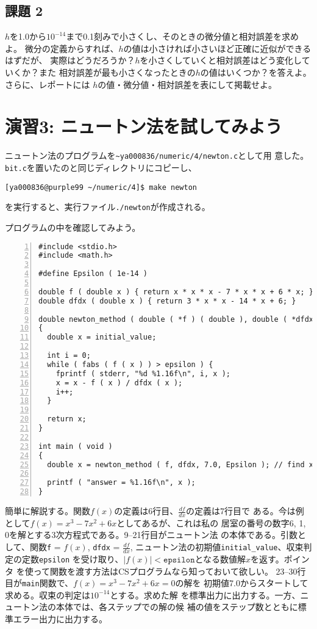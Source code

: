 \documentclass[a4paper]{jsarticle}
\begin{document}
\subsection*{課題 2}
$h$を1.0から$10^{-14}$まで0.1刻みで小さくし、そのときの微分値と相対誤差を求めよ。
微分の定義からすれば、$h$の値は小さければ小さいほど正確に近似ができるはずだが、
実際はどうだろうか？$h$を小さくしていくと相対誤差はどう変化していくか？また
相対誤差が最も小さくなったときの$h$の値はいくつか？を答えよ。さらに、レポートには
$h$の値・微分値・相対誤差を表にして掲載せよ。

\section*{演習3: ニュートン法を試してみよう}

ニュートン法のプログラムを\texttt{\~{}ya000836/numeric/4/newton.c}として用
意した。\texttt{bit.c}を置いたのと同じディレクトリにコピーし、
\begin{lstlisting}
[ya000836@purple99 ~/numeric/4]$ make newton
\end{lstlisting}
を実行すると、実行ファイル\texttt{./newton}が作成される。

プログラムの中を確認してみよう。
\begin{lstlisting}[caption={\texttt{newton.c}},numbers=left]
#include <stdio.h>
#include <math.h>

#define Epsilon ( 1e-14 )

double f ( double x ) { return x * x * x - 7 * x * x + 6 * x; } // solutions are 6, 1, 0
double dfdx ( double x ) { return 3 * x * x - 14 * x + 6; }

double newton_method ( double ( *f ) ( double ), double ( *dfdx ) ( double ), double initial_value, double epsilon )
{
  double x = initial_value;

  int i = 0;
  while ( fabs ( f ( x ) ) > epsilon ) {
    fprintf ( stderr, "%d %1.16f\n", i, x );
    x = x - f ( x ) / dfdx ( x );
    i++;
  }

  return x;
}

int main ( void )
{
  double x = newton_method ( f, dfdx, 7.0, Epsilon ); // find x = 6.0 while starting at 7.0

  printf ( "answer = %1.16f\n", x );
}
\end{lstlisting}

簡単に解説する。関数$f(x)$の定義は6行目、$\displaystyle\frac{df}{dx}$の定義は7行目で
ある。今は例として$f(x) = x^{3} - 7x^{2} + 6x$としてあるが、これは私の
居室の番号の数字6, 1, 0を解とする3次方程式である。9--21行目がニュートン法
の本体である。引数として、関数\texttt{f} = $f(x)$, \texttt{dfdx} =
$\displaystyle\frac{df}{dx}$, ニュートン法の初期値\texttt{initial\_value}、収束判定の定数\texttt{epsilon}
を受け取り、$|f(x)| < \texttt{epsilon}$となる数値解$x$を返す。ポインタ
を使って関数を渡す方法はCSプログラムなら知っておいて欲しい。
23--30行目が\texttt{main}関数で、$f(x) = x^{3} - 7x^{2} + 6x = 0$の解を
初期値7.0からスタートして求める。収束の判定は$10^{-14}$とする。求めた解
を標準出力に出力する。一方、ニュートン法の本体では、各ステップでの解の候
補の値をステップ数とともに標準エラー出力に出力する。
\end{document}
